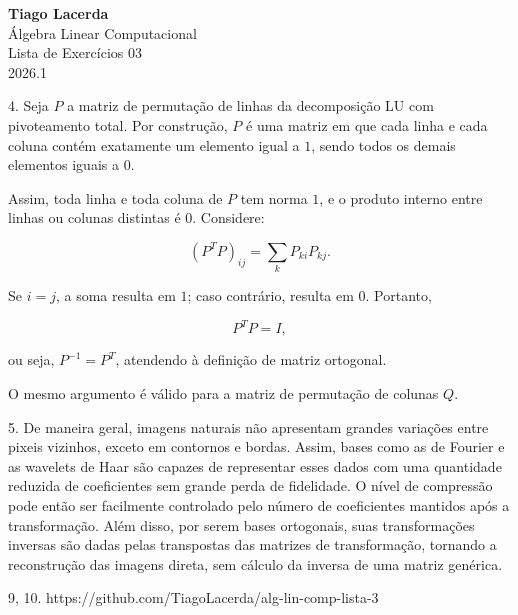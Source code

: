 \documentclass{article}
\begin{document}
\begin{flushleft}
    \textbf{\Large Tiago Lacerda} \\[4pt]
    Álgebra Linear Computacional \\[2pt]
    Lista de Exercícios 03 \\[2pt]
    2026.1
\end{flushleft}

4. Seja $P$ a matriz de permutação de linhas da decomposição LU com
pivoteamento total. Por construção, $P$ é uma matriz em que cada linha e cada
coluna contém exatamente um elemento igual a $1$, sendo todos os demais
elementos iguais a $0$.

Assim, toda linha e toda coluna de $P$ tem norma $1$, e o produto interno entre
linhas ou colunas distintas é $0$. Considere:

\[
    (P^{T}P)_{ij} = \sum_{k} P_{ki}P_{kj}.
\]

Se $i=j$, a soma resulta em $1$; caso contrário, resulta em $0$. Portanto,

\[
    P^{T}P = I,
\]

ou seja, $P^{-1} = P^{T}$, atendendo à definição de matriz ortogonal.

O mesmo argumento é válido para a matriz de permutação de colunas $Q$.

\bigbreak

5. De maneira geral, imagens naturais não apresentam grandes variações entre pixeis vizinhos, exceto em contornos e bordas. Assim, bases como as de Fourier e as wavelets de Haar são capazes de representar esses dados com uma quantidade reduzida de coeficientes sem grande perda de fidelidade. O nível de compressão pode então ser facilmente controlado pelo número de coeficientes mantidos após a transformação. Além disso, por serem bases ortogonais, suas transformações inversas são dadas pelas transpostas das matrizes de transformação, tornando a reconstrução das imagens direta, sem cálculo da inversa de uma matriz genérica.

\bigbreak

9, 10. https://github.com/TiagoLacerda/alg-lin-comp-lista-3
\end{document}
